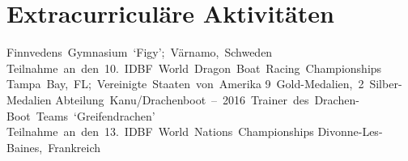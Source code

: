 \documentclass[11pt,a4paper]{moderncv}
\begin{document}


    \section{Extracurriculäre Aktivitäten}
        {Finnvedens~Gymnasium~`Figy';~Värnamo,~Schweden}{}{}{}
        {Teilnahme~an~den~10.~IDBF~World~Dragon~Boat~Racing~Championships\newline}{}%
        {Tampa~Bay,~FL;~Vereinigte~Staaten~von~Amerika\newline}%
        {9~Gold-Medalien,~2~Silber-Medalien}
        {Abteilung~Kanu/Drachenboot~--~2016~Trainer~des~Drachen-Boot~Teams~`Greifendrachen'}{}{}{}{}
        {Teilnahme~an~den~13.~IDBF~World~Nations~Championships\newline}{}%
        {Divonne-Les-Baines,~Frankreich}{}
\end{document}
